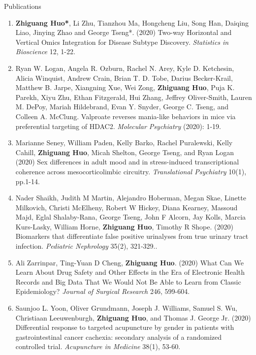 \documentclass{resume} %
\begin{document}
\begin{rSection}{Publications}
\begin{enumerate}[noitemsep,topsep=0pt, resume]
\item {\bf  Zhiguang Huo*}, Li Zhu, Tianzhou Ma, Hongcheng Liu, Song Han, Daiqing Liao, Jinying Zhao and George Tseng*.  (2020)
Two-way Horizontal and Vertical Omics Integration for Disease Subtype Discovery. \emph{Statistics in Bioscience} 12, 1-22.

\item
Ryan W. Logan, Angela R. Ozburn, Rachel N. Arey, Kyle D. Ketchesin, Alicia Winquist, Andrew Crain, Brian T. D. Tobe, Darius Becker-Krail, Matthew B. Jarpe, Xiangning Xue, Wei Zong, {\bf Zhiguang Huo}, Puja K. Parekh, Xiyu Zhu, Ethan Fitzgerald, Hui Zhang, Jeffrey Oliver-Smith, Lauren M. DePoy, Mariah Hildebrand, Evan Y. Snyder, George C. Tseng, and Colleen A. McClung. 
Valproate reverses mania-like behaviors in mice via preferential targeting of HDAC2.
\emph{Molecular Psychiatry} (2020): 1-19.

\item 
Marianne Seney, William Paden, Kelly Barko, Rachel Puralewski, Kelly Cahill, {\bf Zhiguang Huo}, Micah Shelton, George Tseng, and Ryan Logan
(2020)
Sex differences in adult mood and in stress-induced transcriptional coherence across mesocorticolimbic circuitry.
\emph{Translational Psychiatry}  10(1), pp.1-14.

\item
Nader Shaikh, Judith M Martin, Alejandro Hoberman, Megan Skae, Linette Milkovich, Christi McElheny, Robert W Hickey, Diana Kearney, Massoud Majd, Eglal Shalaby-Rana, George Tseng, John F Alcorn, Jay Kolls, Marcia Kurs-Lasky, William Horne, {\bf Zhiguang Huo}, Timothy R Shope.  (2020)
Biomarkers that differentiate false positive urinalyses from true urinary tract infection. 
\emph{Pediatric Nephrology}  35(2), 321-329..



\item
Ali Zarrinpar,  Ting-Yuan D Cheng, {\bf Zhiguang Huo}. (2020)
What Can We Learn About Drug Safety and Other Effects in the Era of Electronic Health Records and Big Data That We Would Not Be Able to Learn from Classic Epidemiology?
\emph{Journal of Surgical Research} 246, 599-604.

\item 
Saunjoo L. Yoon, Oliver Grundmann, Joseph J. Williams, Samuel S. Wu, Christiaan Leeuwenburgh, {\bf Zhiguang Huo}, and Thomas J. George Jr. (2020)
Differential response to targeted acupuncture by gender in patients with gastrointestinal cancer cachexia: secondary analysis of a randomized controlled trial.
\emph{Acupuncture in Medicine}  38(1), 53-60.


\end{enumerate}
\end{rSection}
\end{document}
